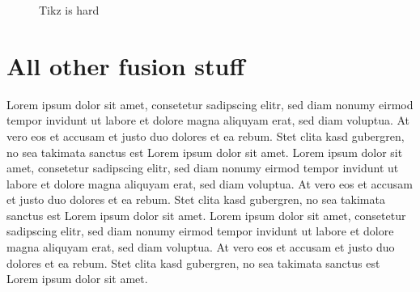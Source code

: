 \begin{figure}[htpb]
	\caption{Tikz is hard}
\end{figure}

\section{All other fusion stuff}
Lorem ipsum dolor sit amet, consetetur sadipscing elitr, sed diam nonumy eirmod tempor invidunt ut labore et dolore magna aliquyam erat, sed diam voluptua.
At vero eos et accusam et justo duo dolores et ea rebum. Stet clita kasd gubergren, no sea takimata sanctus est Lorem ipsum dolor sit amet.
Lorem ipsum dolor sit amet, consetetur sadipscing elitr, sed diam nonumy eirmod tempor invidunt ut labore et dolore magna aliquyam erat, sed diam voluptua.
At vero eos et accusam et justo duo dolores et ea rebum. Stet clita kasd gubergren, no sea takimata sanctus est Lorem ipsum dolor sit amet.
Lorem ipsum dolor sit amet, consetetur sadipscing elitr, sed diam nonumy eirmod tempor invidunt ut labore et dolore magna aliquyam erat, sed diam voluptua.
At vero eos et accusam et justo duo dolores et ea rebum. Stet clita kasd gubergren, no sea takimata sanctus est Lorem ipsum dolor sit amet.


